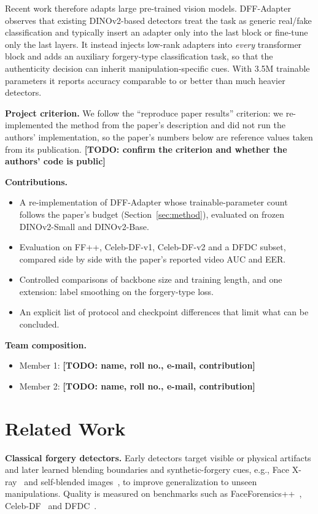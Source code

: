 \documentclass[lettersize,journal]{IEEEtran}
\newcommand{\todo}[1]{\textbf{[TODO: #1]}}
\begin{document}
Recent work therefore adapts large pre-trained vision models. DFF-Adapter~\cite{zhang2026dff} observes that existing DINOv2-based detectors treat the task as generic real/fake classification and typically insert an adapter only into the last block or fine-tune only the last layers. It instead injects low-rank adapters into \emph{every} transformer block and adds an auxiliary forgery-type classification task, so that the authenticity decision can inherit manipulation-specific cues. With 3.5M trainable parameters it reports accuracy comparable to or better than much heavier detectors.

\textbf{Project criterion.} We follow the ``reproduce paper results'' criterion: we re-implemented the method from the paper's description and did not run the authors' implementation, so the paper's numbers below are reference values taken from its publication. \todo{confirm the criterion and whether the authors' code is public}

\textbf{Contributions.}
\begin{itemize}
\item A re-implementation of DFF-Adapter whose trainable-parameter count follows the paper's budget (Section~\ref{sec:method}), evaluated on frozen DINOv2-Small and DINOv2-Base.
\item Evaluation on FF++, Celeb-DF-v1, Celeb-DF-v2 and a DFDC subset, compared side by side with the paper's reported video AUC and EER.
\item Controlled comparisons of backbone size and training length, and one extension: label smoothing on the forgery-type loss.
\item An explicit list of protocol and checkpoint differences that limit what can be concluded.
\end{itemize}

\textbf{Team composition.}
\begin{itemize}
\item Member 1: \todo{name, roll no., e-mail, contribution}
\item Member 2: \todo{name, roll no., e-mail, contribution}
\end{itemize}

\section{Related Work}
\textbf{Classical forgery detectors.} Early detectors target visible or physical artifacts and later learned blending boundaries and synthetic-forgery cues, e.g., Face X-ray~\cite{li2020facexray} and self-blended images~\cite{shiohara2022sbi}, to improve generalization to unseen manipulations. Quality is measured on benchmarks such as FaceForensics++~\cite{rossler2019faceforensics}, Celeb-DF~\cite{li2020celebdf} and DFDC~\cite{dolhansky2020dfdc}.
\end{document}
